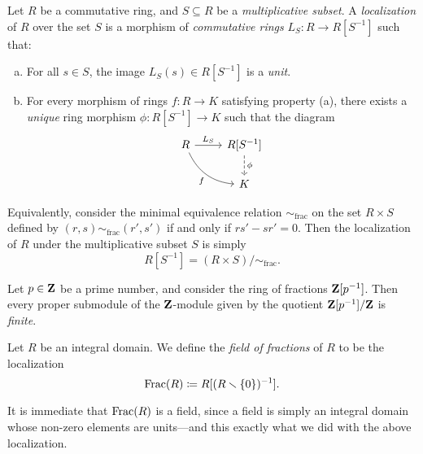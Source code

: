\begin{definition}[Localization]
    \label{def:localization-ring}
    Let \(R\) be a commutative ring, and \(S \subseteq R\) be a \emph{multiplicative
        subset}. A \emph{localization} of \(R\) over the set \(S\) is a morphism of
    \emph{commutative rings} \(L_S: R \to R[S^{-1}]\) such that:
    \begin{enumerate}[(a)]\setlength\itemsep{0em}
        \item For all \(s \in S\), the image \(L_S(s) \in R[S^{-1}]\) is a \emph{unit}.
        \item For every morphism of rings \(f: R \to K\) satisfying property (a), there
              exists a \emph{unique} ring morphism \(\phi: R[S^{-1}] \to K\) such that the
              diagram
              \[
                  \begin{tikzcd}
                      R \ar[r, "L_S"] \ar[rd, bend right, "f"']
                      &{R[S^{-1}]} \ar[d, "\phi", dashed] \\
                      &K
                  \end{tikzcd}
              \]
    \end{enumerate}
    Equivalently, consider the minimal equivalence relation \(\sim_{\text{frac}}\)
    on the set \(R \times S\) defined by \((r, s) \sim_{\text{frac}} (r', s')\) if
    and only if \(r s' - s r' = 0\). Then the localization of \(R\) under the
    multiplicative subset \(S\) is simply
    \[
        R[S^{-1}] = (R \times S)/{\sim_{\text{frac}}}.
    \]
\end{definition}

\begin{example}
    \label{exp:Z[1/p]/Z-finite-submodules}
    Let \(p \in \mathbf{Z}\) be a prime number, and consider the ring of fractions
    \(\mathbf{Z}[p^{-1}]\). Then every proper submodule of the \(\mathbf{Z}\)-module given by the
    quotient \(\mathbf{Z}[p^{-1}]/\mathbf{Z}\) is \emph{finite}.
\end{example}

\begin{definition}
    \label{def:field-of-fractions}
    Let \(R\) be an integral domain. We define the \emph{field of fractions} of
    \(R\) to be the localization
    \[
        \operatorname{Frac}(R) \coloneq R[(R \smallsetminus \{0\})^{-1}].
    \]
\end{definition}

It is immediate that \(\operatorname{Frac}(R)\) is a field, since a field is simply an
integral domain whose non-zero elements are units---and this exactly what we did
with the above localization.

